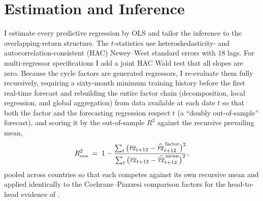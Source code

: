 \section{Estimation and Inference}
\label{sec:meth-inference}

I estimate every predictive regression by OLS and tailor
the inference to the overlapping-return structure. The $t$-statistics use
heteroskedasticity- and autocorrelation-consistent (HAC) Newey--West standard
errors \citep{neweywest1987} with $18$ lags. For
multi-regressor specifications I add a joint HAC Wald test that all slopes are
zero. Because the cycle
factors are generated regressors, I re-evaluate them fully
recursively\label{sec:meth-oos}, requiring a sixty-month minimum training
history before the first real-time forecast and rebuilding the entire factor chain
(decomposition, local regression, and global aggregation) from data available at
each date $t$ so that both the factor and the forecasting regression respect $t$
(a ``doubly out-of-sample'' forecast), and scoring it by the
\citet{campbellthompson2008} out-of-sample $R^{2}$ against the recursive
prevailing mean,
\begin{equation}
  R^{2}_{\mathrm{oos}} \;=\; 1 -
     \frac{\sum_{t}\big(\overline{\mathit{rx}}_{t+12}-\widehat{\overline{\mathit{rx}}}^{\,\text{factor}}_{t+12}\big)^{2}}
          {\sum_{t}\big(\overline{\mathit{rx}}_{t+12}-\widehat{\overline{\mathit{rx}}}^{\,\text{mean}}_{t+12}\big)^{2}},
  \label{eq:meth-ctr2}
\end{equation}
pooled across countries so that each competes against its own recursive mean and
applied identically to the Cochrane--Piazzesi comparison factors for the
head-to-head evidence of .

